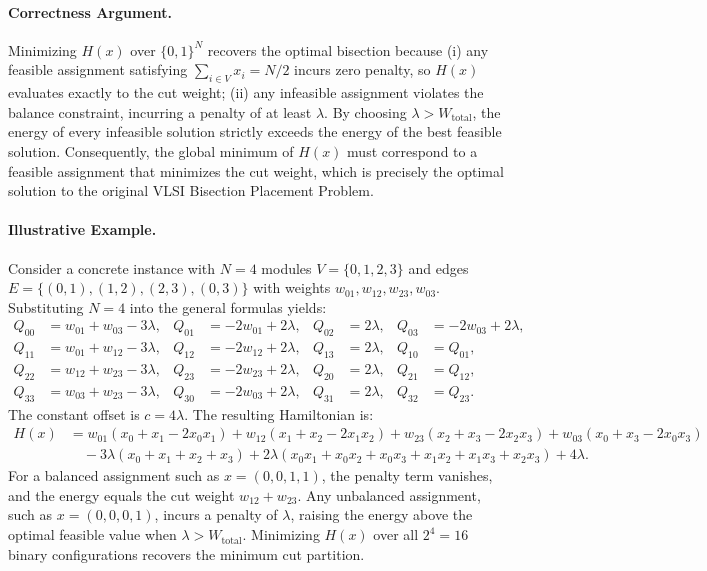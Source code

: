 \documentclass[12pt]{article}
\begin{document}
\paragraph{Correctness Argument.}
Minimizing $H(x)$ over $\{0,1\}^N$ recovers the optimal bisection because (i) any feasible assignment satisfying $\sum_{i \in V} x_i = N/2$ incurs zero penalty, so $H(x)$ evaluates exactly to the cut weight; (ii) any infeasible assignment violates the balance constraint, incurring a penalty of at least $\lambda$. By choosing $\lambda > W_{\text{total}}$, the energy of every infeasible solution strictly exceeds the energy of the best feasible solution. Consequently, the global minimum of $H(x)$ must correspond to a feasible assignment that minimizes the cut weight, which is precisely the optimal solution to the original VLSI Bisection Placement Problem.

\paragraph{Illustrative Example.}
Consider a concrete instance with $N = 4$ modules $V = \{0, 1, 2, 3\}$ and edges $E = \{(0,1), (1,2), (2,3), (0,3)\}$ with weights $w_{01}, w_{12}, w_{23}, w_{03}$. Substituting $N=4$ into the general formulas yields:
\begin{align}
Q_{00} &= w_{01} + w_{03} - 3\lambda, & Q_{01} &= -2w_{01} + 2\lambda, & Q_{02} &= 2\lambda, & Q_{03} &= -2w_{03} + 2\lambda, \\
Q_{11} &= w_{01} + w_{12} - 3\lambda, & Q_{12} &= -2w_{12} + 2\lambda, & Q_{13} &= 2\lambda, & Q_{10} &= Q_{01}, \\
Q_{22} &= w_{12} + w_{23} - 3\lambda, & Q_{23} &= -2w_{23} + 2\lambda, & Q_{20} &= 2\lambda, & Q_{21} &= Q_{12}, \\
Q_{33} &= w_{03} + w_{23} - 3\lambda, & Q_{30} &= -2w_{03} + 2\lambda, & Q_{31} &= 2\lambda, & Q_{32} &= Q_{23}.
\end{align}
The constant offset is $c = 4\lambda$. The resulting Hamiltonian is:
\begin{align}
H(x) &= w_{01}(x_0 + x_1 - 2x_0 x_1) + w_{12}(x_1 + x_2 - 2x_1 x_2) + w_{23}(x_2 + x_3 - 2x_2 x_3) + w_{03}(x_0 + x_3 - 2x_0 x_3) \\
&\quad - 3\lambda(x_0 + x_1 + x_2 + x_3) + 2\lambda(x_0 x_1 + x_0 x_2 + x_0 x_3 + x_1 x_2 + x_1 x_3 + x_2 x_3) + 4\lambda.
\end{align}
For a balanced assignment such as $x = (0,0,1,1)$, the penalty term vanishes, and the energy equals the cut weight $w_{12} + w_{23}$. Any unbalanced assignment, such as $x = (0,0,0,1)$, incurs a penalty of $\lambda$, raising the energy above the optimal feasible value when $\lambda > W_{\text{total}}$. Minimizing $H(x)$ over all $2^4 = 16$ binary configurations recovers the minimum cut partition.
\end{document}
